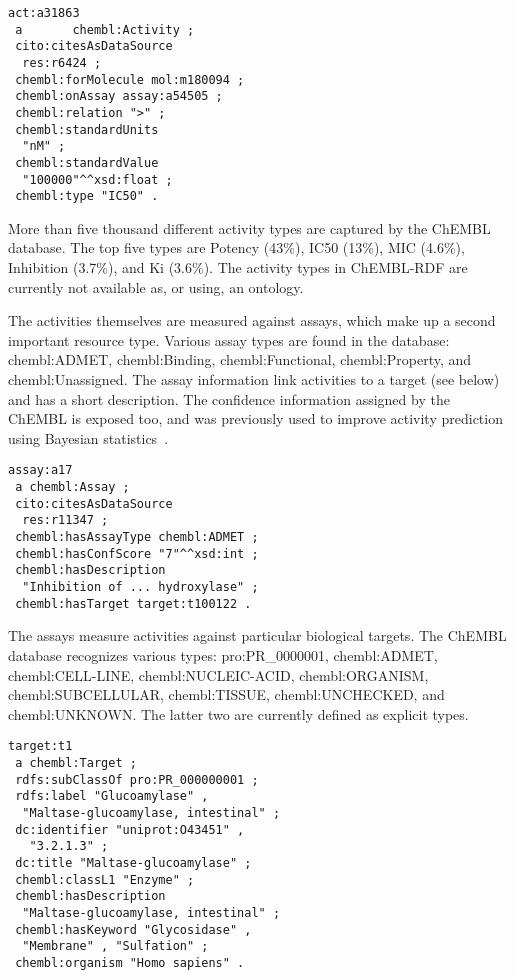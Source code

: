\documentclass[sw]{iosart2c}
\begin{document}
\begin{footnotesize}
\begin{verbatim}
act:a31863
 a       chembl:Activity ;
 cito:citesAsDataSource
  res:r6424 ;
 chembl:forMolecule mol:m180094 ;
 chembl:onAssay assay:a54505 ;
 chembl:relation ">" ;
 chembl:standardUnits
  "nM" ;
 chembl:standardValue
  "100000"^^xsd:float ;
 chembl:type "IC50" .
\end{verbatim}
\end{footnotesize}

More than five thousand different activity types are captured by the ChEMBL database.
The top five types are Potency (43\%), IC50 (13\%), MIC (4.6\%), Inhibition (3.7\%),
and Ki (3.6\%). The activity types in ChEMBL-RDF are currently not available as, or
using, an ontology.

The activities themselves are measured against assays, which make up a second important
resource type. Various assay types are found in the database: chembl:ADMET, chembl:Binding,
chembl:Functional, chembl:Property, and chembl:Unassigned. The assay information link
activities to a target (see below) and has a short description. The confidence information
assigned by the ChEMBL is exposed too, and was previously used to improve activity
prediction using Bayesian statistics~\cite{Willighagen2011}.

\begin{footnotesize}
\begin{verbatim}
assay:a17
 a chembl:Assay ;
 cito:citesAsDataSource
  res:r11347 ;
 chembl:hasAssayType chembl:ADMET ;
 chembl:hasConfScore "7"^^xsd:int ;
 chembl:hasDescription
  "Inhibition of ... hydroxylase" ;
 chembl:hasTarget target:t100122 .
\end{verbatim}
\end{footnotesize}

The assays measure activities against particular biological targets. The ChEMBL database
recognizes various types: pro:PR\_0000001, chembl:ADMET, chembl:CELL-LINE,
chembl:NUCLEIC-ACID, chembl:ORGANISM, chembl:SUBCELLULAR, chembl:TISSUE,
chembl:UNCHECKED, and chembl:UNKNOWN. The latter two are currently defined as
explicit types.

\begin{footnotesize}
\begin{verbatim}
target:t1
 a chembl:Target ;
 rdfs:subClassOf pro:PR_000000001 ;
 rdfs:label "Glucoamylase" , 
  "Maltase-glucoamylase, intestinal" ;
 dc:identifier "uniprot:O43451" ,
   "3.2.1.3" ;
 dc:title "Maltase-glucoamylase" ;
 chembl:classL1 "Enzyme" ;
 chembl:hasDescription
  "Maltase-glucoamylase, intestinal" ;
 chembl:hasKeyword "Glycosidase" , 
  "Membrane" , "Sulfation" ;
 chembl:organism "Homo sapiens" .
\end{verbatim}
\end{footnotesize}
\end{document}
